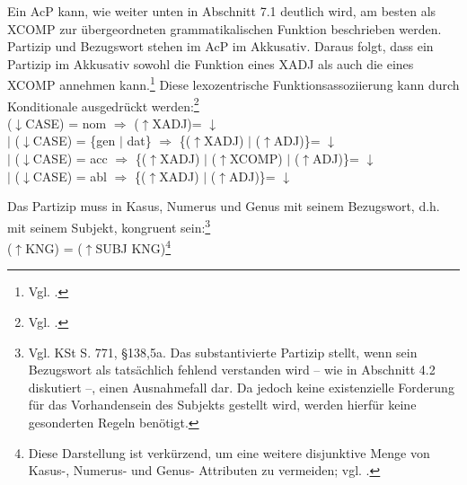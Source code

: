 \documentclass[12pt,a4paper]{article}
\begin{document}
Ein AcP kann, wie weiter unten in Abschnitt 7.1 deutlich wird, am besten als XCOMP zur übergeordneten grammatikalischen Funktion beschrieben werden. Partizip und Bezugswort stehen im AcP im Akkusativ. Daraus folgt, dass ein Partizip im Akkusativ sowohl die Funktion eines XADJ als auch die eines XCOMP annehmen kann.\footnote{Vgl. \cite[48]{Skript}.} Diese lexozentrische Funktionsassoziierung kann durch Konditionale ausgedrückt werden:\footnote{Vgl. \cite[48]{Skript}.} \\
($\downarrow$CASE) = nom $\Rightarrow$ ($\uparrow$XADJ)= $\downarrow$ \\
$\mid$ ($\downarrow$CASE) = \{gen $\mid$ dat\} $\Rightarrow$ \{($\uparrow$XADJ) $\mid$ ($\uparrow$ADJ)\}= $\downarrow$ \\
$\mid$ ($\downarrow$CASE) = acc $\Rightarrow$ \{($\uparrow$XADJ) $\mid$ ($\uparrow$XCOMP) $\mid$ ($\uparrow$ADJ)\}= $\downarrow$ \\
$\mid$ ($\downarrow$CASE) = abl $\Rightarrow$ \{($\uparrow$XADJ) $\mid$ ($\uparrow$ADJ)\}= $\downarrow$ 

Das Partizip muss in Kasus, Numerus und Genus mit seinem Bezugswort, d.h. mit seinem Subjekt, kongruent sein:\footnote{Vgl. KSt S. 771, §138,5a. Das substantivierte Partizip stellt, wenn sein Bezugswort als tatsächlich fehlend verstanden wird -- wie in Abschnitt 4.2 diskutiert --, einen Ausnahmefall dar. Da jedoch keine existenzielle Forderung für das Vorhandensein des Subjekts gestellt wird, werden hierfür keine gesonderten Regeln benötigt.}\\ 
($\uparrow$KNG) = ($\uparrow$SUBJ KNG)\footnote{Diese Darstellung ist verkürzend, um eine weitere disjunktive Menge von Kasus-, Numerus- und Genus- Attributen zu vermeiden; vgl. \cite[49]{Skript}.}
\end{document}
